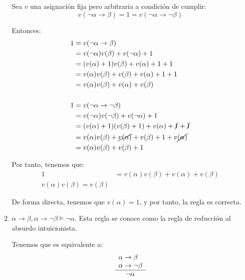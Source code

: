 \begin{ejercicio*}
\begin{enumerate}
        Sea $v$ una asignación fija pero arbitraria a condición de cumplir:
        \begin{equation*}
            v(\lnot\alpha\rightarrow\beta)=1=v(\lnot\alpha\rightarrow\lnot\beta)
        \end{equation*}

        Entonces:
        \begin{align*}
            1 &= v(\lnot\alpha\rightarrow\beta)\\
            &= v(\lnot\alpha)v(\beta)+v(\lnot\alpha)+1\\
            &= (v(\alpha)+1)v(\beta)+v(\alpha)+1+1\\
            &= v(\alpha)v(\beta)+v(\beta)+v(\alpha)+1+1\\
            &= v(\alpha)v(\beta)+v(\alpha)+v(\beta)\\ \\
            1 &= v(\lnot\alpha\rightarrow\lnot\beta)\\
            &= v(\lnot\alpha)v(\lnot\beta)+v(\lnot\alpha)+1\\
            &= (v(\alpha)+1)(v(\beta)+1)+v(\alpha)+\cancel{1}+\cancel{1}\\
            &= v(\alpha)v(\beta)+\cancel{v(\alpha)}+v(\beta)+1+v\cancel{(\alpha)}\\
            &= v(\alpha)v(\beta)+v(\beta)+1
        \end{align*}

        Por tanto, tenemos que:
        \begin{align*}
            1 &= v(\alpha)v(\beta)+v(\alpha)+v(\beta)\\
            v(\alpha)v(\beta) = v(\beta)
        \end{align*}

        De forma directa, tenemos que $v(\alpha)=1$, y por tanto, la regla es correcta.

        \item $\alpha\rightarrow\beta,\alpha\rightarrow\lnot\beta\models\lnot\alpha$. Esta regla se conoce como la regla de reducción al absurdo intuicionista.
        
        Tenemos que es equivalente a:
        \begin{equation*}
            \begin{array}{l}
                \alpha\rightarrow\beta\\
                \alpha\rightarrow\lnot\beta\\ \hline
                \multicolumn{1}{c}{\lnot\alpha}
            \end{array}
        \end{equation*}


\end{enumerate}
\end{ejercicio*}
